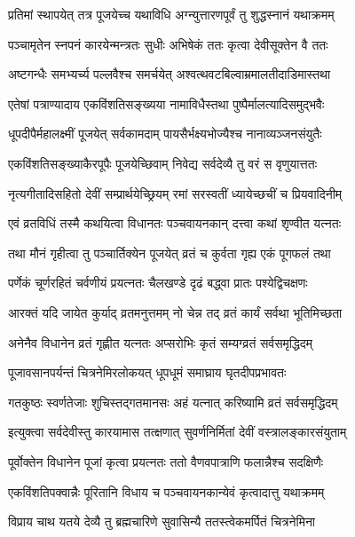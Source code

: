 \begin{center}
\twolineshloka
{प्रतिमां स्थापयेत् तत्र पूजयेच्च यथाविधि}
{अग्न्युत्तारणपूर्वं तु शुद्धस्नानं यथाक्रमम्}%


\twolineshloka
{पञ्चामृतेन स्नपनं कारयेन्मन्त्रतः सुधीः}
{अभिषेकं ततः कृत्वा देवीसूक्तेन वै ततः}%


\twolineshloka
{अष्टगन्धैः समभ्यर्च्य पल्लवैश्च समर्चयेत्}
{अश्वत्थवटबिल्वाम्रमालतीदाडिमास्तथा}%


\twolineshloka
{एतेषां पत्राण्यादाय एकविंशतिसङ्ख्यया}
{नामाविधैस्तथा पुष्पैर्मालत्यादिसमुद्भवैः}%


\twolineshloka
{धूपदीपैर्महालक्ष्मीं पूजयेत् सर्वकामदाम्}
{पायसैर्भक्ष्यभोज्यैश्च नानाव्यञ्जनसंयुतैः}%


\twolineshloka
{एकविंशतिसङ्ख्याकैरपूपैः पूजयेच्छिवाम्}
{निवेद्य सर्वदेव्यै तु वरं स वृणुयात्ततः}%


\twolineshloka
{नृत्यगीतादिसहितो देवीं सम्प्रार्थयेच्छ्रियम्}
{रमां सरस्वतीं ध्यायेच्छचीं च प्रियवादिनीम्}%


\twolineshloka
{एवं व्रतविधिं तस्मै कथयित्वा विधानतः}
{पञ्चवायनकान् दत्त्वा कथां शृण्वीत यत्नतः}%


\twolineshloka
{तथा मौनं गृहीत्वा तु पञ्चार्तिक्येन पूजयेत्}
{व्रतं च कुर्वता गृह्य एकं पूगफलं तथा}%


\twolineshloka
{पर्णेकं चूर्णरहितं चर्वणीयं प्रयत्नतः}
{चैलखण्डे दृढं बद्ध्वा प्रातः पश्येद्विचक्षणः}%


\twolineshloka
{आरक्तं यदि जायेत कुर्याद् व्रतमनुत्तमम्}
{नो चेन्न तद् व्रतं कार्यं सर्वथा भूतिमिच्छता}%


\twolineshloka
{अनेनैव विधानेन व्रतं गृह्णीत यत्नतः}
{अप्सरोभिः कृतं सम्यग्व्रतं सर्वसमृद्धिदम्}%


\twolineshloka
{पूजावसानपर्यन्तं चित्रनेमिरलोकयत्}
{धूपधूमं समाघ्राय घृतदीपप्रभावतः}%


\twolineshloka
{गतकुष्ठः स्वर्णतेजाः शुचिस्तद्गतमानसः}
{अहं यत्नात् करिष्यामि व्रतं सर्वसमृद्धिदम्}%


\twolineshloka
{इत्युक्त्वा सर्वदेवीस्तु कारयामास तत्क्षणात्}
{सुवर्णनिर्मितां देवीं वस्त्रालङ्कारसंयुताम्}%


\twolineshloka
{पूर्वोक्तेन विधानेन पूजां कृत्वा प्रयत्नतः}
{ततो वैणवपात्राणि फलान्नैश्च सदक्षिणैः}%


\twolineshloka
{एकविंशतिपक्वान्नैः पूरितानि विधाय च}
{पञ्चवायनकान्येवं कृत्वादात्तु यथाक्रमम्}%


\twolineshloka
{विप्राय चाथ यतये देव्यै तु ब्रह्मचारिणे}
{सुवासिन्यै ततस्त्वेकमर्पितं चित्रनेमिना}%



\end{center}

